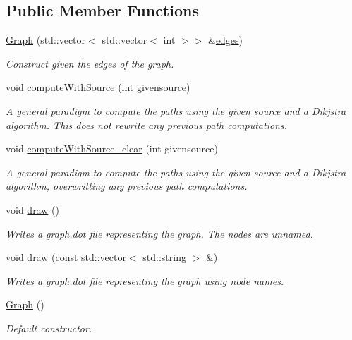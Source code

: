 \subsection*{Public Member Functions}
\begin{DoxyCompactItemize}
\item 
\hyperlink{classMackey_1_1Graph_a979aefd7d97cd0344637180c00e7db1b}{Graph} (std\+::vector$<$ std\+::vector$<$ int $>$$>$ \&\hyperlink{classMackey_1_1Graph_a729ec24b9f9e504f4c4e2d3f6e2cab83}{edges})
\begin{DoxyCompactList}\small\item\em Construct given the edges of the graph. \end{DoxyCompactList}\item 
void \hyperlink{classMackey_1_1Graph_acda32cd8d144dcd1ec771bd8d2753321}{compute\+With\+Source} (int givensource)
\begin{DoxyCompactList}\small\item\em A general paradigm to compute the paths using the given source and a Dikjstra algorithm. This does not rewrite any previous path computations. \end{DoxyCompactList}\item 
void \hyperlink{classMackey_1_1Graph_a769966fd9422efb15a53db185a8be278}{compute\+With\+Source\+\_\+clear} (int givensource)
\begin{DoxyCompactList}\small\item\em A general paradigm to compute the paths using the given source and a Dikjstra algorithm, overwritting any previous path computations. \end{DoxyCompactList}\item 
void \hyperlink{classMackey_1_1Graph_ab88d38f2fa1822d415ce7dac272b32dc}{draw} ()
\begin{DoxyCompactList}\small\item\em Writes a graph.\+dot file representing the graph. The nodes are unnamed. \end{DoxyCompactList}\item 
void \hyperlink{classMackey_1_1Graph_a63aa485ca7838f3dc66da1749e09cd84}{draw} (const std\+::vector$<$ std\+::string $>$ \&)
\begin{DoxyCompactList}\small\item\em Writes a graph.\+dot file representing the graph using node names. \end{DoxyCompactList}\item 
\hyperlink{classMackey_1_1Graph_a910e6687de1a1a90df5b656e3c850a01}{Graph} ()
\begin{DoxyCompactList}\small\item\em Default constructor. \end{DoxyCompactList}\end{DoxyCompactItemize}
